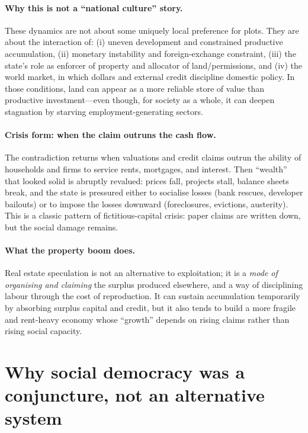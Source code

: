 \paragraph{Why this is not a ``national culture'' story.}
These dynamics are not about some uniquely local preference for plots. They are about the interaction of:
(i) uneven development and constrained productive accumulation,
(ii) monetary instability and foreign-exchange constraint,
(iii) the state’s role as enforcer of property and allocator of land/permissions, and
(iv) the world market, in which dollars and external credit discipline domestic policy.
In those conditions, land can appear as a more reliable store of value than productive investment---even though,
for society as a whole, it can deepen stagnation by starving employment-generating sectors.

\paragraph{Crisis form: when the claim outruns the cash flow.}
The contradiction returns when valuations and credit claims outrun the ability of households and firms to
service rents, mortgages, and interest. Then ``wealth'' that looked solid is abruptly revalued: prices fall,
projects stall, balance sheets break, and the state is pressured either to socialise losses (bank rescues,
developer bailouts) or to impose the losses downward (foreclosures, evictions, austerity). This is a classic
pattern of fictitious-capital crisis: paper claims are written down, but the social damage remains.

\paragraph{What the property boom does.}
Real estate speculation is not an alternative to exploitation; it is a \emph{mode of organising and claiming}
the surplus produced elsewhere, and a way of disciplining labour through the cost of reproduction. It can
sustain accumulation temporarily by absorbing surplus capital and credit, but it also tends to build a more
fragile and rent-heavy economy whose ``growth'' depends on rising claims rather than rising social capacity.


\section{Why social democracy was a conjuncture, not an alternative system}
\label{sec:socdem-conjuncture}

